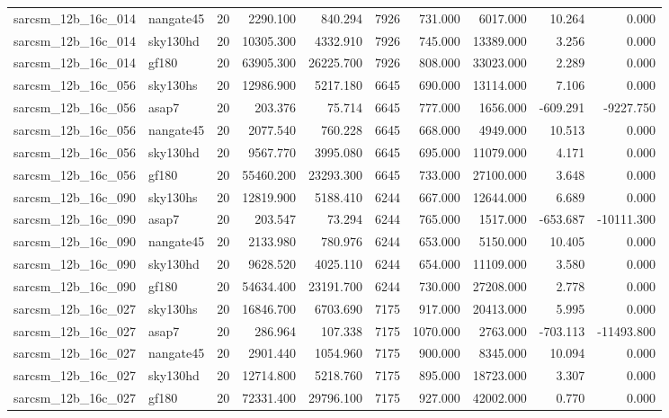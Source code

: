 \begin{longtable}{llrrrrrrrr}
sarcsm\_12b\_16c\_014 & nangate45 & 20 & 2290.100 & 840.294 & 7926 & 731.000 & 6017.000 & 10.264 & 0.000 \\
sarcsm\_12b\_16c\_014 & sky130hd & 20 & 10305.300 & 4332.910 & 7926 & 745.000 & 13389.000 & 3.256 & 0.000 \\
sarcsm\_12b\_16c\_014 & gf180 & 20 & 63905.300 & 26225.700 & 7926 & 808.000 & 33023.000 & 2.289 & 0.000 \\
sarcsm\_12b\_16c\_056 & sky130hs & 20 & 12986.900 & 5217.180 & 6645 & 690.000 & 13114.000 & 7.106 & 0.000 \\
sarcsm\_12b\_16c\_056 & asap7 & 20 & 203.376 & 75.714 & 6645 & 777.000 & 1656.000 & -609.291 & -9227.750 \\
sarcsm\_12b\_16c\_056 & nangate45 & 20 & 2077.540 & 760.228 & 6645 & 668.000 & 4949.000 & 10.513 & 0.000 \\
sarcsm\_12b\_16c\_056 & sky130hd & 20 & 9567.770 & 3995.080 & 6645 & 695.000 & 11079.000 & 4.171 & 0.000 \\
sarcsm\_12b\_16c\_056 & gf180 & 20 & 55460.200 & 23293.300 & 6645 & 733.000 & 27100.000 & 3.648 & 0.000 \\
sarcsm\_12b\_16c\_090 & sky130hs & 20 & 12819.900 & 5188.410 & 6244 & 667.000 & 12644.000 & 6.689 & 0.000 \\
sarcsm\_12b\_16c\_090 & asap7 & 20 & 203.547 & 73.294 & 6244 & 765.000 & 1517.000 & -653.687 & -10111.300 \\
sarcsm\_12b\_16c\_090 & nangate45 & 20 & 2133.980 & 780.976 & 6244 & 653.000 & 5150.000 & 10.405 & 0.000 \\
sarcsm\_12b\_16c\_090 & sky130hd & 20 & 9628.520 & 4025.110 & 6244 & 654.000 & 11109.000 & 3.580 & 0.000 \\
sarcsm\_12b\_16c\_090 & gf180 & 20 & 54634.400 & 23191.700 & 6244 & 730.000 & 27208.000 & 2.778 & 0.000 \\
sarcsm\_12b\_16c\_027 & sky130hs & 20 & 16846.700 & 6703.690 & 7175 & 917.000 & 20413.000 & 5.995 & 0.000 \\
sarcsm\_12b\_16c\_027 & asap7 & 20 & 286.964 & 107.338 & 7175 & 1070.000 & 2763.000 & -703.113 & -11493.800 \\
sarcsm\_12b\_16c\_027 & nangate45 & 20 & 2901.440 & 1054.960 & 7175 & 900.000 & 8345.000 & 10.094 & 0.000 \\
sarcsm\_12b\_16c\_027 & sky130hd & 20 & 12714.800 & 5218.760 & 7175 & 895.000 & 18723.000 & 3.307 & 0.000 \\
sarcsm\_12b\_16c\_027 & gf180 & 20 & 72331.400 & 29796.100 & 7175 & 927.000 & 42002.000 & 0.770 & 0.000 \\

\end{longtable}

